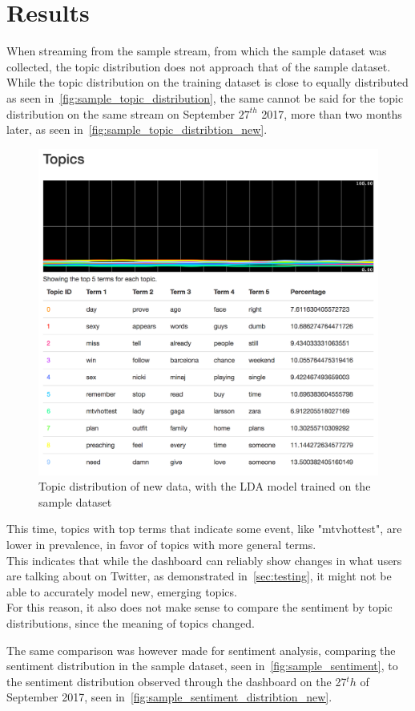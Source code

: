 \chapter{Results}
\label{ch:results}

When streaming from the sample stream, from which the sample dataset was collected,
the topic distribution does not approach that of the sample dataset.
While the topic distribution on the training dataset is close to equally distributed as seen in~\autoref{fig:sample_topic_distribution},
the same cannot be said for the topic distribution on the same stream on September $27^{th}$ 2017, more than two months later,
as seen in~\autoref{fig:sample_topic_distribtion_new}.

\begin{figure}
    \centering
    \caption{Topic distribution of new data, with the LDA model trained on the sample dataset}
    \label{fig:sample_topic_distribtion_new}
    \includegraphics[width=\textwidth]{../images/dashboard_topics_sample.png}
\end{figure}

This time, topics with top terms that indicate some event, like "mtvhottest", are lower in prevalence,
in favor of topics with more general terms.\\
This indicates that while the dashboard can reliably show changes in what users are talking about on Twitter,
as demonstrated in~\autoref{sec:testing},
it might not be able to accurately model new, emerging topics.
\\
For this reason, it also does not make sense to compare the sentiment by topic distributions,
since the meaning of topics changed.
\par
The same comparison was however made for sentiment analysis, comparing the sentiment distribution in the sample dataset, seen in~\autoref{fig:sample_sentiment},
to the sentiment distribution observed through the dashboard on the 27$^th$ of September 2017, seen in~\autoref{fig:sample_sentiment_distribtion_new}.

